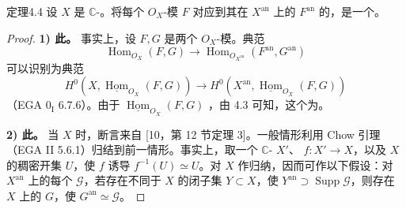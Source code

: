 \begin{SGAresult}{定理}{4.4}
设 $X$ 是 $\mathbb C$-。将每个 $O_X$-模 $F$ 对应到其在 $X^{\mathrm{an}}$ 上的 $F^{\mathrm{an}}$ 的，是一个。
\end{SGAresult}
\begin{proof}
\textbf{1) 此。} 事实上，设 $F,G$ 是两个 $O_X$-模。典范
\[
\operatorname{Hom}_{O_X}(F,G)\longrightarrow
\operatorname{Hom}_{O_{X^{\mathrm{an}}}}(F^{\mathrm{an}},G^{\mathrm{an}})
\]
可以识别为典范
\[
H^0(X,\underline{\operatorname{Hom}}_{O_X}(F,G))\longrightarrow
H^0(X^{\mathrm{an}},\underline{\operatorname{Hom}}_{O_X}(F,G))
\]
（EGA $0_{\mathrm I}$ 6.7.6）。由于 $\underline{\operatorname{Hom}}_{O_X}(F,G)$ ，由 4.3 可知，这个为。

\textbf{2) 此。} 当 $X$ 时，断言来自 [10，第 12 节定理 3]。一般情形利用 Chow 引理（EGA II 5.6.1）归结到前一情形。事实上，取一个 $\mathbb C$- $X'$、 $f:X'\to X$，以及 $X$ 的稠密开集 $U$，使 $f$ 诱导 $f^{-1}(U)\simeq U$。对 $X$ 作归纳，因而可作以下假设：对 $X^{\mathrm{an}}$ 上的每个 $\mathcal G$，若存在不同于 $X$ 的闭子集 $Y\subset X$，使 $Y^{\mathrm{an}}\supset\operatorname{Supp}\mathcal G$，则存在 $X$ 上的 $G$，使 $G^{\mathrm{an}}\simeq\mathcal G$。


\end{proof}
